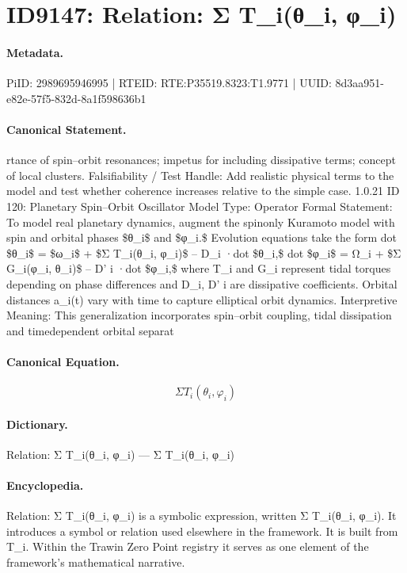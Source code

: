 \section*{ID9147: Relation: Σ T\_i(θ\_i, φ\_i)}
\paragraph{Metadata.}
PiID: 2989695946995 | RTEID: RTE:P35519.8323:T1.9771 | UUID: 8d3aa951-e82e-57f5-832d-8a1f598636b1

\paragraph{Canonical Statement.}
rtance of spin–orbit resonances; impetus for including dissipative terms; concept of local clusters. Falsifiability / Test Handle: Add realistic physical terms to the model and test whether coherence increases relative to the simple case. 1.0.21 ID 120: Planetary Spin–Orbit Oscillator Model Type: Operator Formal Statement: To model real planetary dynamics, augment the spinonly Kuramoto model with spin and orbital phases \$θ\_i\$ and \$φ\_i.\$ Evolution equations take the form dot \$θ\_i\$ = \$ω\_i\$ + \$Σ T\_i(θ\_i, φ\_i)\$ – D\_i ·dot \$θ\_i,\$ dot \$φ\_i\$ = Ω\_i + \$Σ G\_i(φ\_i, θ\_i)\$ – D’ i ·dot \$φ\_i,\$ where T\_i and G\_i represent tidal torques depending on phase differences and D\_i, D’ i are dissipative coefficients. Orbital distances a\_i(t) vary with time to capture elliptical orbit dynamics. Interpretive Meaning: This generalization incorporates spin–orbit coupling, tidal dissipation and timedependent orbital separat

\paragraph{Canonical Equation.}
\[
Σ T_i(θ_i, φ_i)
\]

\paragraph{Dictionary.}
Relation: Σ T\_i(θ\_i, φ\_i) — Σ T\_i(θ\_i, φ\_i)

\paragraph{Encyclopedia.}
Relation: Σ T\_i(θ\_i, φ\_i) is a symbolic expression, written Σ T\_i(θ\_i, φ\_i). It introduces a symbol or relation used elsewhere in the framework. It is built from T\_i. Within the Trawin Zero Point registry it serves as one element of the framework's mathematical narrative.
